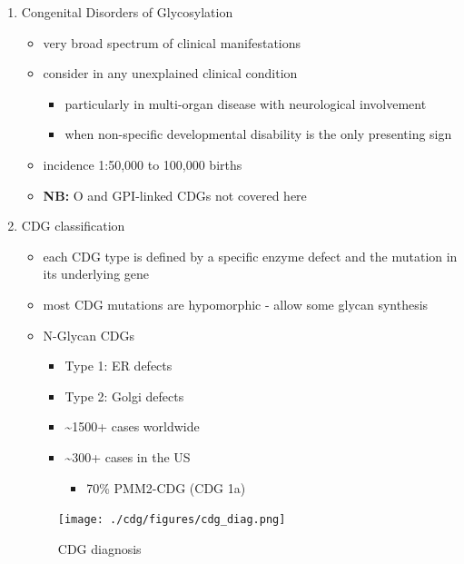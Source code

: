 \documentclass{scrartcl}
\begin{document}
\begin{enumerate}
\item Congenital Disorders of Glycosylation
\label{sec:org43758d9}
\begin{itemize}
\item very broad spectrum of clinical manifestations
\item consider in any unexplained clinical condition
\begin{itemize}
\item particularly in multi-organ disease with neurological involvement
\item when non-specific developmental disability is the only presenting sign
\end{itemize}
\item incidence 1:50,000 to 100,000 births
\item \textbf{NB:} O and GPI-linked CDGs not covered here
\end{itemize}
\item CDG classification
\label{sec:orgdf9bf0e}
\begin{itemize}
\item each CDG type is defined by a specific enzyme defect and the mutation in its underlying gene
\item most CDG mutations are hypomorphic - allow some glycan synthesis
\item N-Glycan CDGs
\begin{itemize}
\item Type 1: ER defects
\item Type 2: Golgi defects
\item \textasciitilde{}1500+ cases worldwide
\item \textasciitilde{}300+ cases in the US
\begin{itemize}
\item 70\% PMM2-CDG (CDG 1a)
\end{itemize}
\end{itemize}
\end{itemize}

\begin{figure}[htbp]
\centering
\texttt{[image: ./cdg/figures/cdg\_diag.png]}
\caption{\label{fig:org9725fc1}
CDG diagnosis}
\end{figure}
\end{enumerate}
\end{document}
